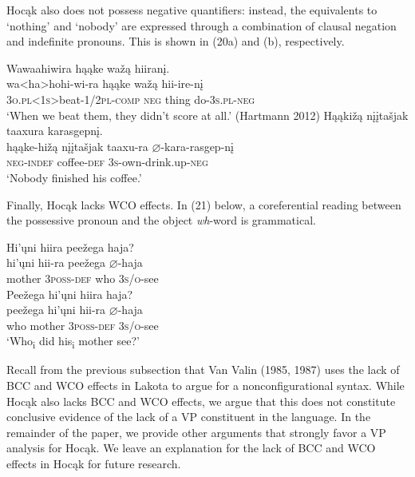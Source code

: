 \documentclass[output=paper]{LSP/langsci}
\begin{document}
Hoc\k{a}k also does not possess negative quantifiers: instead, the equivalents to `nothing' and `nobody' are expressed through a combination of clausal negation and indefinite pronouns. This is shown in (20a) and (b), respectively.

\begin{exe}
\ex
\begin{xlist}
\ex	
\glll Wawaahiwira 	h\k{a}\k{a}ke 	wa\v{z}\k{a} 	hiiran\k{i}. \\
wa<ha>hohi-wi-ra 						h\k{a}\k{a}ke 	wa\v{z}\k{a} 	hii-ire-n\k{i} \\
	\textsc{3o.pl<1s>}beat-\textsc{1/2pl}-\textsc{comp} \textsc{neg}		thing 	do-\textsc{3s.pl-neg} \\
\trans `When we beat them, they didn't score at all.' (Hartmann 2012)
\ex	
\glll H\k{a}\k{a}ki\v{z}\k{a} 	{n\k{i}\k{i}ta\v{s}jak taaxura} 	karasgepn\k{i}. \\
h\k{a}\k{a}ke-hi\v{z}\k{a}  {n\k{i}\k{i}ta\v{s}jak taaxu-ra }	$\varnothing$-kara-rasgep-n\k{i} \\
	\textsc{neg-indef} 	coffee-\textsc{def}	\textsc{3s}-own-drink.up-\textsc{neg} \\
\trans `Nobody finished his coffee.'
\end{xlist}
\end{exe}
	
Finally, Hoc\k{a}k lacks WCO effects. In (21) below, a coreferential reading between the possessive pronoun and the object \textit{wh}-word is grammatical.

\begin{exe}
\ex
\begin{xlist}
\ex	
\glll Hi'\k{u}ni		hiira					pee\v{z}ega		haja? \\
hi'\k{u}ni		hii-ra 			pee\v{z}ega		$\varnothing$-haja \\
	mother		3\textsc{poss-def}		who	\textsc{3s/o}-see \\
\ex 
\glll Pee\v{z}ega 	hi'\k{u}ni 		hiira		haja?\\
pee\v{z}ega 	hi'\k{u}ni 		hii-ra 		$\varnothing$-haja \\
	who 	mother 	3\textsc{poss-def} 	\textsc{3s/o}-see \\
\trans `Who\textsubscript{i} did his\textsubscript{i} mother see?'
\end{xlist}
\end{exe}

Recall from the previous subsection that Van Valin (1985, 1987) uses the lack of BCC and WCO effects in Lakota to argue for a nonconfigurational syntax. While Hoc\k{a}k also lacks BCC and WCO effects, we argue that this does not constitute conclusive evidence of the lack of a VP constituent in the language. In the remainder of the paper, we provide other arguments that strongly favor a VP analysis for Hoc\k{a}k. We leave an explanation for the lack of BCC and WCO effects in Hoc\k{a}k for future research.
\end{document}
